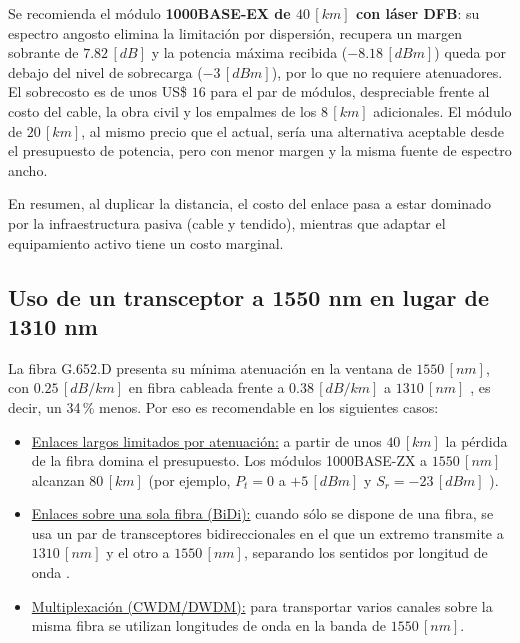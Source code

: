 Se recomienda el módulo \textbf{1000BASE-EX de $40 \, [km]$ con láser DFB}: su espectro angosto elimina la limitación por dispersión, recupera un margen sobrante de $7.82 \, [dB]$ y la potencia máxima recibida ($-8.18 \, [dBm]$) queda por debajo del nivel de sobrecarga ($-3 \, [dBm]$), por lo que no requiere atenuadores. El sobrecosto es de unos US\$ $16$ para el par de módulos, despreciable frente al costo del cable, la obra civil y los empalmes de los $8 \, [km]$ adicionales. El módulo de $20 \, [km]$, al mismo precio que el actual, sería una alternativa aceptable desde el presupuesto de potencia, pero con menor margen y la misma fuente de espectro ancho.

En resumen, al duplicar la distancia, el costo del enlace pasa a estar dominado por la infraestructura pasiva (cable y tendido), mientras que adaptar el equipamiento activo tiene un costo marginal.


\subsection{Uso de un transceptor a 1550 nm en lugar de 1310 nm}
\label{sec_5.2}
La fibra G.652.D presenta su mínima atenuación en la ventana de $1550 \, [nm]$, con $0.25 \, [dB/km]$ en fibra cableada frente a $0.38 \, [dB/km]$ a $1310 \, [nm]$ \cite{b3}, es decir, un 34\,\% menos. Por eso es recomendable en los siguientes casos:
\begin{itemize}
    \item \underline{Enlaces largos limitados por atenuación:} a partir de unos $40 \, [km]$ la pérdida de la fibra domina el presupuesto. Los módulos 1000BASE-ZX a $1550 \, [nm]$ alcanzan $80 \, [km]$ (por ejemplo, $P_{t} = 0$ a $+5 \, [dBm]$ y $S_{r} = -23 \, [dBm]$ \cite{b11}).
    \item \underline{Enlaces sobre una sola fibra (BiDi):} cuando sólo se dispone de una fibra, se usa un par de transceptores bidireccionales en el que un extremo transmite a $1310 \, [nm]$ y el otro a $1550 \, [nm]$, separando los sentidos por longitud de onda \cite{b7}.
    \item \underline{Multiplexación (CWDM/DWDM):} para transportar varios canales sobre la misma fibra se utilizan longitudes de onda en la banda de $1550 \, [nm]$.
\end{itemize}


